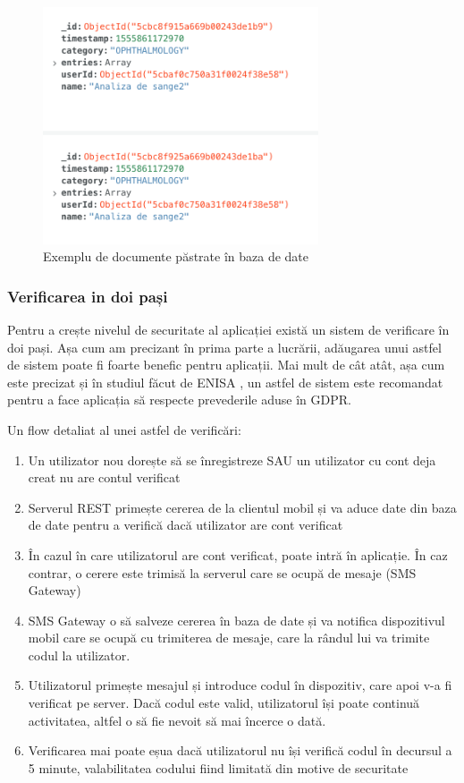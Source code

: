 \documentclass[12pt]{article}
\begin{document}
\begin{figure}[H]
\centering
\includegraphics[height=7cm]{exmongo.png}
\caption{Exemplu de documente păstrate în baza de date}
\end{figure}

\newpage

\subsubsection{Verificarea in doi pași}

Pentru a crește nivelul de securitate al aplicației există un sistem de verificare
în doi pași. Așa cum am precizant în prima parte a lucrării, adăugarea unui astfel de sistem
poate fi foarte benefic pentru aplicații.
Mai mult de cât atât, așa cum este precizat și în studiul făcut de ENISA \cite{enisa-2019}, un
astfel de sistem este recomandat pentru a face aplicația să respecte prevederile aduse în GDPR. 

\bigskip

Un flow detaliat al unei astfel de verificări:

\begin{enumerate}
    \item Un utilizator nou dorește să se înregistreze SAU un utilizator cu cont deja creat
    nu are contul verificat
    \item Serverul REST primește cererea de la clientul mobil și va aduce date din baza de date pentru
    a verifică dacă utilizator are cont verificat
    \item În cazul în care utilizatorul are cont verificat, poate intră în aplicație. În caz contrar,
    o cerere este trimisă la serverul care se ocupă de mesaje (SMS Gateway)
    \item SMS Gateway o să salveze cererea în baza de date și va notifica dispozitivul mobil 
    care se ocupă cu trimiterea de mesaje, care la rândul lui va trimite codul la utilizator.
    \item Utilizatorul primește mesajul și introduce codul în dispozitiv, care apoi v-a fi verificat 
    pe server. Dacă codul este valid, utilizatorul își poate continuă activitatea, altfel o să fie nevoit
    să mai încerce o dată.
    \item Verificarea mai poate eșua dacă utilizatorul nu își verifică codul în decursul a 5 minute, valabilitatea
    codului fiind limitată din motive de securitate
\end{enumerate}
\end{document}
